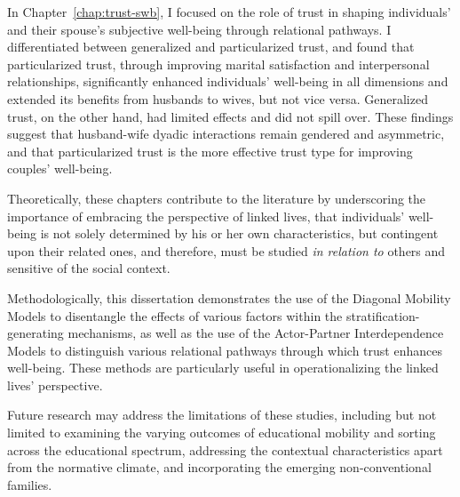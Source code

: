 In Chapter~\ref{chap:trust-swb}, I focused on the role of trust in shaping individuals' and their spouse's subjective well-being through relational pathways. I differentiated between generalized and particularized trust, and found that particularized trust, through improving marital satisfaction and interpersonal relationships, significantly enhanced individuals' well-being in all dimensions and extended its benefits from husbands to wives, but not vice versa. Generalized trust, on the other hand, had limited effects and did not spill over. These findings suggest that husband-wife dyadic interactions remain gendered and asymmetric, and that particularized trust is the more effective trust type for improving couples' well-being.

Theoretically, these chapters contribute to the literature by underscoring the importance of embracing the perspective of linked lives, that individuals' well-being is not solely determined by his or her own characteristics, but contingent upon their related ones, and therefore, must be studied \textit{in relation to} others and sensitive of the social context.

Methodologically, this dissertation demonstrates the use of the Diagonal Mobility Models to disentangle the effects of various factors within the stratification-generating mechanisms, as well as the use of the Actor-Partner Interdependence Models to distinguish various relational pathways through which trust enhances well-being. These methods are particularly useful in operationalizing the linked lives' perspective.

Future research may address the limitations of these studies, including but not limited to examining the varying outcomes of educational mobility and sorting across the educational spectrum, addressing the contextual characteristics apart from the normative climate, and incorporating the emerging non-conventional families.
